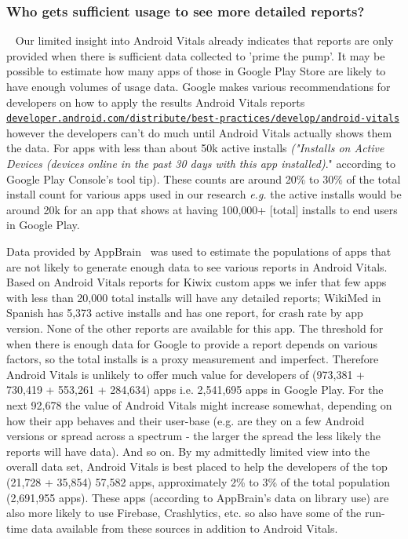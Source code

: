 \subsubsection{Who gets sufficient usage to see more detailed reports?}~\label{tata-sufficient-usage-to-see-more-detailed-reports-topic}
Our limited insight into Android Vitals already indicates that reports are only provided when there is sufficient data collected to 'prime the pump'. It may be possible to estimate how many apps of those in Google Play Store are likely to have enough volumes of usage data. Google makes various recommendations for developers on how to apply the results Android Vitals reports \href{https://developer.android.com/distribute/best-practices/develop/android-vitals}{\nolinkurl{developer.android.com/distribute/best-practices/develop/android-vitals}} however the developers can't do much until Android Vitals actually shows them the data. For apps with less than about 50k active installs \emph{("Installs on Active Devices (devices online in the past 30 days with this app installed)}." according to Google Play Console's tool tip). These counts are around 20\% to 30\% of the total install count for various apps used in our research \emph{e.g.} the active installs would be around 20k for an app that shows at having 100,000+ [total] installs to end users in Google Play.

Data provided by AppBrain~\cite{appbrain_download_statistics_june_2019} was used to estimate the populations of apps that are not likely to generate enough data to see various reports in Android Vitals.
% 
Based on Android Vitals reports for Kiwix custom apps we infer that few apps with less than 20,000 total installs will have any detailed reports; WikiMed in Spanish has 5,373 active installs and has one report, for crash rate by app version. None of the other reports are available for this app. The threshold for when there is enough data for Google to provide a report depends on various factors, so the total installs is a proxy measurement and imperfect. Therefore Android Vitals is unlikely to offer much value for developers of (973,381 + 730,419 + 553,261 + 284,634) apps i.e. 2,541,695 apps in Google Play. For the next 92,678 the value of Android Vitals might increase somewhat, depending on how their app behaves and their user-base (e.g. are they on a few Android versions or spread across a spectrum - the larger the spread the less likely the reports will have data). And so on. By my admittedly limited view into the overall data set, Android Vitals is best placed to help the developers of the top (21,728 + 35,854) 57,582 apps, approximately 2\% to 3\% of the total population (2,691,955 apps). These apps (according to AppBrain's data on library use) are also more likely to use Firebase, Crashlytics, etc. so also have some of the run-time data available from these sources in addition to Android Vitals.

